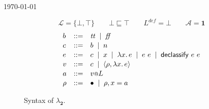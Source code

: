 \documentclass{article}
\makeatletter
\theoremstyle{definition}
\newcommand{\at}{\ensuremath{{\scriptstyle{@}}}}
\makeatother
\begin{document}
\begin{flushright}
  \today
\end{flushright}

\begin{figure}[ht]
  \centering
  \[
  \mathcal{L} = \{ \bot, \top \}
  \qquad
  \bot \sqsubseteq \top
  \qquad
  L^{\mathit{def}} = \bot
  \qquad
  \mathcal{A} = \mathbf{1}
  \]
  \[
  \begin{array}[t]{lcl}
    b & ::= &
    \mathit{tt}\;\; |\;\;
    \mathit{ff}
    \\[0.3ex]
    c & :: = &
    b\;\; |\;\;
    n
    \\[0.3ex]
    e & ::= &
    c\;\; |\;\;
    x\;\; |\;\;
    \lambda{x}.\, e\;\; |\;\;
    e\ e\;\; |\;\;
    \mathsf{declassify}\ e\ e
    \\[0.3ex]
    v & ::= &
    c\;\; |\;\;
    \langle{\rho, \lambda{x}.\, e\rangle}
    \\[0.3ex]
    a & ::= &
    v \at L
    \\[0.3ex]
    \rho & ::= &
    \bullet\;\; |\;\;
    \rho, x = a
  \end{array}
  \]
  \caption{Syntax of $\lambda_{\mathbf{2}}$.}
  \label{fig:syntax}
\end{figure}
\end{document}

